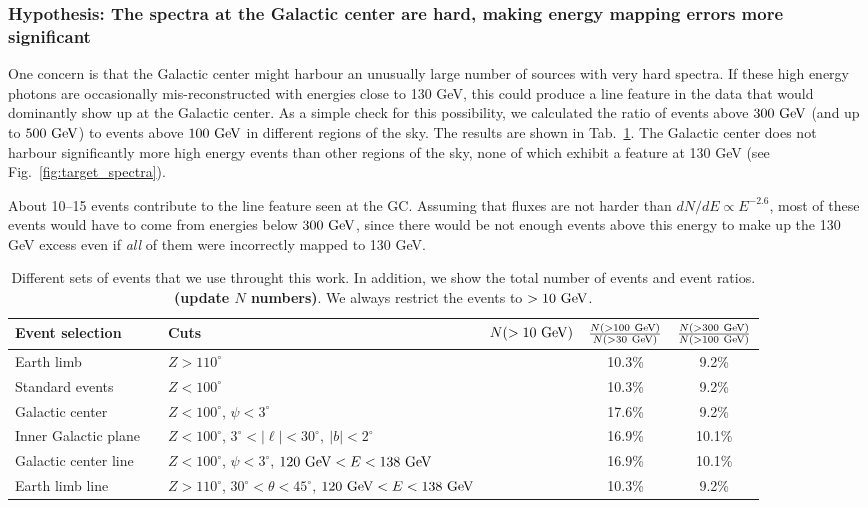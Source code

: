 \documentclass[aps,twocolumn,prd,superscriptaddress,showpacs,nofootinbib,fixfloat]{revtex4}
\newcommand{\GeV}{{\rm ~GeV}}
\begin{document}
\subsubsection{Hypothesis: The spectra at the Galactic center are hard, making
energy mapping errors more significant}

One concern is that the Galactic center might harbour an
unusually large number of sources with very hard spectra. If
these high energy photons are occasionally mis-reconstructed
with energies close to 130 GeV, this could produce a line
feature in the data that would dominantly show up at the
Galactic center. As a simple check for this possibility, we
calculated the ratio of events above $300\GeV$ (and up to
$500\GeV$) to events above $100\GeV$ in different regions of
the sky. The results are shown in
Tab.~\ref{tab:regions}.  The Galactic center does not
harbour significantly more high energy events than other
regions of the sky, none of which exhibit a feature at 130
GeV (see Fig.~\ref{fig:target_spectra}).

About 10--15 events contribute to the line feature seen at the GC. Assuming
that fluxes are not harder than $dN/dE \propto E^{-2.6}$, most of these events
would
have to come from energies below $300\GeV$, since there would be not enough
events above this energy to make up the 130 GeV excess even if \emph{all} of
them were incorrectly mapped to 130 GeV. 

\begin{table}
  \begin{tabular}{lllccc}
    \hline
    Event selection &&Cuts & $N(>10\GeV)$ & $\frac{N(>100\GeV)}{N(>30\GeV)}$ & $\frac{N(>300\GeV)}{N(>100\GeV)}$\\
    \hline
    Earth limb           &  & $Z>110^\circ$                                                  &  & 10.3\% & 9.2\% \\
    Standard events      &  & $Z<100^\circ$                                                  &  & 10.3\% & 9.2\% \\
    Galactic center      &  & $Z<100^\circ$, $\psi<3^\circ$                                  &  & 17.6\% & 9.2\% \\
    Inner Galactic plane &  & $Z<100^\circ$, $3^\circ < |\ell| < 30^\circ,\ |b|<2^\circ$     &  & 16.9\% & 10.1\% \\
    Galactic center line &  & $Z<100^\circ$, $\psi<3^\circ$, $120\GeV<E<138\GeV$             &  & 16.9\% & 10.1\% \\
    Earth limb line      &  & $Z>110^\circ$, $30^\circ<\theta<45^\circ$, $120\GeV<E<138\GeV$ &  & 10.3\% & 9.2\% \\ 
    \hline
  \end{tabular}
  \caption{Different sets of events that we use throught this work. In
  addition, we show the total number of events and event ratios.
  \textbf{(update $N$ numbers)}. We always restrict the events to $>10\GeV$.}
  \label{tab:regions}
\end{table}
\end{document}
